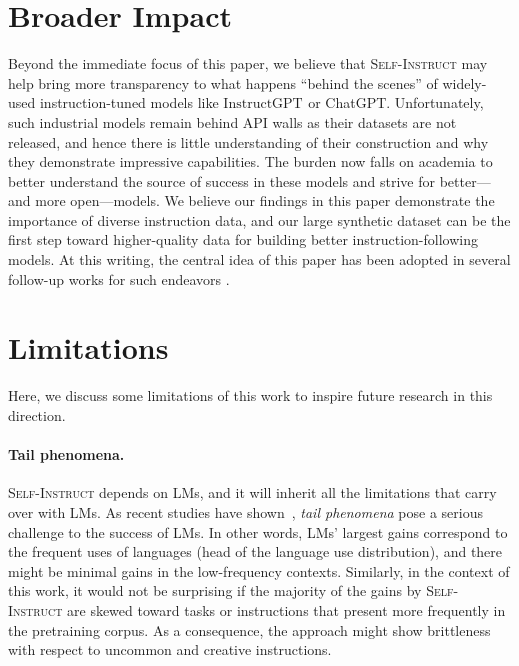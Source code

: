 \documentclass[11pt]{article}
\newcommand{\name}{\textsc{Self-Instruct}}
\newcommand{\gptinstruct}[1]{$\text{InstructGPT}_{\text{#1}}$}
\begin{document}
\section{Broader Impact}

Beyond the immediate focus of this paper, we believe that \name{} may help bring more transparency to what happens ``behind the scenes'' of widely-used instruction-tuned models like \gptinstruct{} or ChatGPT. 
Unfortunately, such industrial models remain behind API walls as their datasets are not released, and hence there is little understanding of their construction and why they demonstrate impressive capabilities.
The burden now falls on academia to better understand the source of success in these models and strive for better---and more open---models. We believe our findings in this paper demonstrate the importance of diverse instruction data, and our large synthetic dataset can be the first step toward higher-quality data for building better instruction-following models. 
At this writing, the central idea of this paper has been adopted in several follow-up works for such endeavors \citep[i.a.]{alpaca,xu2023baize,sun2023principle}. 

\section{Limitations}
Here, we discuss some limitations of this work to inspire future research in this direction.  

\paragraph{Tail phenomena.} 
\name{} depends on LMs, and it will inherit all the limitations that carry over with LMs. 
As recent studies have shown~\cite{razeghi2022impact,kandpal2022large},  \emph{tail phenomena} pose a serious challenge to the success of LMs. In other words, LMs' largest gains correspond to the frequent uses of languages (head of the language use distribution), and there might be minimal gains in the low-frequency contexts. 
Similarly, in the context of this work, it would not be surprising if the majority of the gains by \name{} are skewed toward 
tasks or instructions that present more frequently in the pretraining corpus. 
As a consequence, the approach might show brittleness with respect to uncommon and creative instructions.
\end{document}
